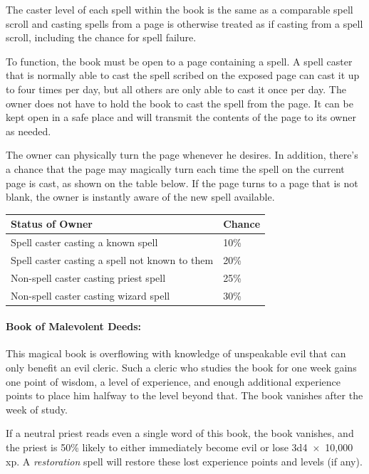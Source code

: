 \begin{multicols}{2}
The caster level of each spell within the book is the same as a comparable spell scroll and casting spells from a page is otherwise treated as if casting from a spell scroll, including the chance for spell failure.  

To function, the book must be open to a page containing a spell.  A spell caster that is normally able to cast the spell scribed on the exposed page can cast it up to four times per day, but all others are only able to cast it once per day.  The owner does not have to hold the book to cast the spell from the page.  It can be kept open in a safe place and will transmit the contents of the page to its owner as needed.  
 
The owner can physically turn the page whenever he desires.  In addition, there's a chance that the page may magically turn each time the spell on the current page is cast, as shown on the table below.  If the page turns to a page that is not blank, the owner is instantly aware of the new spell available.

\noindent
\begin{tabular}{|p{}|p{}|}
\hline
Status of Owner	& Chance \\
\hline\hline
\rowcolor[gray]{.9}Spell caster casting a known spell	& 10\% \\
Spell caster casting a spell not known to them	& 20\% \\
\rowcolor[gray]{.9}Non-spell caster casting priest spell	& 25\% \\
Non-spell caster casting wizard spell	& 30\% \\
\hline
\end{tabular}

\paragraph{Book of Malevolent Deeds:} This magical book is overflowing with knowledge of unspeakable evil that can only benefit an evil cleric.  Such a cleric who studies the book for one week gains one point of wisdom, a level of experience, and enough additional experience points to place him halfway to the level beyond that.  The book vanishes after the week of study.

If a neutral priest reads even a single word of this book, the book vanishes, and the priest is 50\% likely to either immediately become evil or lose 3d4~$\times$~10,000 xp.  A \textit{restoration} spell will restore these lost experience points and levels (if any).


\end{multicols}
